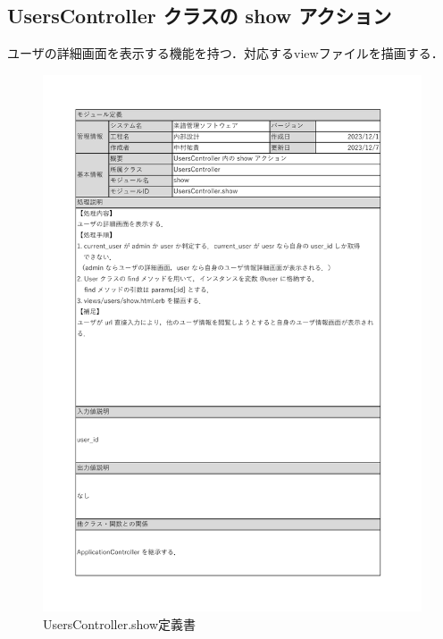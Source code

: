 \subsection*{UsersController クラスの show アクション}
ユーザの詳細画面を表示する機能を持つ．対応するviewファイルを描画する．
\begin{figure}[H]
    \centering
    \includegraphics[scale=0.5]{img/Users/xlsx/UsersController_show.pdf}
    \vspace{-0.3cm}
    \caption{UsersController.show定義書}
\end{figure}
